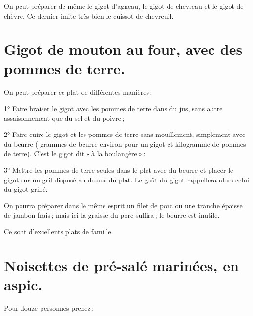 On peut préparer de même le gigot d'agneau, le gigot de chevreau et le gigot de
chèvre. Ce dernier imite très bien le cuissot de chevreuil.

\section*{\centering Gigot de mouton au four, avec des pommes de terre.}
{}

On peut préparer ce plat de différentes manières :

1° Faire braiser le gigot avec les pommes de terre dans du jus, sans autre
assaisonnement que du sel et du poivre ;

2° Faire cuire le gigot et les pommes de terre sans mouillement, simplement
avec du beurre ({\mmm} grammes de beurre environ pour un gigot et {\mmm} kilogramme de
pommes de terre). C'est le gigot dit « à la boulangère » :

3° Mettre les pommes de terre seules dans le plat avec du beurre et placer le
gigot sur un gril disposé au-dessus du plat. Le goût du gigot rappellera alors
celui du gigot grillé.

\sk

On pourra préparer dans le même esprit un filet de porc ou une tranche épaisse
de jambon frais ; mais ici la graisse du porc suffira ; le beurre est inutile.

\medskip

Ce sont d'excellents plats de famille.

\section*{\centering Noisettes de pré-salé marinées, en aspic.}
{}

Pour douze personnes prenez :

